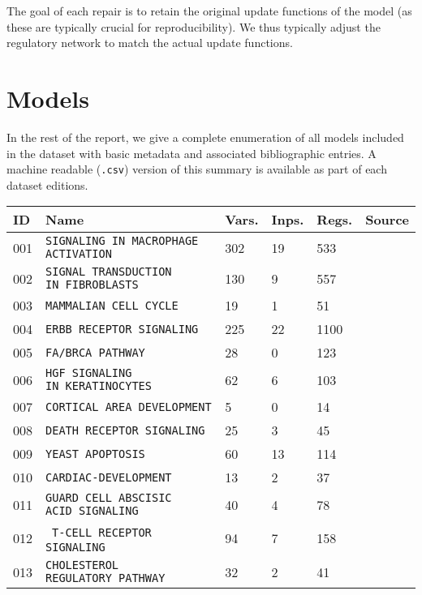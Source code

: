 \documentclass{article}
\begin{document}
The goal of each repair is to retain the original update functions of the model (as these are typically crucial for reproducibility). We thus typically adjust the regulatory network to match the actual update functions.

\section{Models}

In the rest of the report, we give a complete enumeration of all models included in the dataset with basic metadata and associated bibliographic entries. A machine readable (\texttt{.csv}) version of this summary is available as part of each dataset editions.

\begin{center}
	\begin{tabular}{ | C{16pt} | C{144pt} | C{25pt} | C{25pt} | C{25pt} | C{36pt} | }
		\hline
		ID & Name & Vars. & Inps. & Regs. & Source \\  & \texttt{SIGNALING IN MACROPHAGE ACTIVATION} & 302 & 19 & 533 & \cite{bbm-001} \\  & \texttt{SIGNAL TRANSDUCTION IN~FIBROBLASTS} & 130 & 9 & 557 & \cite{bbm-002} \\  & \texttt{MAMMALIAN CELL CYCLE} & 19 & 1 & 51 & \cite{bbm-003} \\  & \texttt{ERBB RECEPTOR SIGNALING} & 225 & 22 & 1100 & \cite{bbm-004}  \\  & \texttt{FA/BRCA PATHWAY} & 28 & 0 & 123 & \cite{bbm-005} \\  & \texttt{HGF SIGNALING IN~KERATINOCYTES} & 62 & 6 & 103 & \cite{bbm-006} \\  & \texttt{CORTICAL AREA DEVELOPMENT} & 5 & 0 & 14 & \cite{bbm-007} \\  & \texttt{DEATH RECEPTOR SIGNALING} & 25 & 3 & 45 & \cite{bbm-008-150} \\  & \texttt{YEAST APOPTOSIS} & 60 & 13 & 114 & \cite{bbm-009} \\  & \texttt{CARDIAC-DEVELOPMENT} & 13 & 2 & 37 & \cite{bbm-010} \\  & \texttt{GUARD CELL ABSCISIC ACID~SIGNALING} & 40 & 4 & 78 & \cite{bbm-011} \\  & \texttt{T-CELL RECEPTOR SIGNALING} & 94 & 7 & 158 & \cite{bbm-012} \\  & \texttt{CHOLESTEROL REGULATORY~PATHWAY} & 32 & 2 & 41 & \cite{bbm-013} \\ \hline

\end{tabular}
\end{center}
\end{document}
